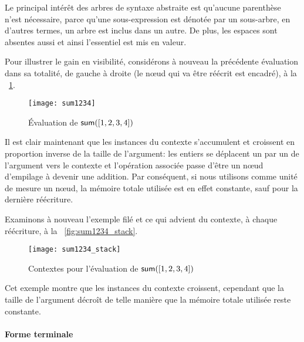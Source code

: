 Le principal intérêt des arbres de syntaxe abstraite est qu'aucune
parenthèse n'est nécessaire, parce qu'une sous-expression est dénotée
par un sous-arbre, en d'autres termes, un arbre est inclus dans un
autre. De plus, les espaces sont absentes aussi et ainsi l'essentiel
est mis en valeur.

Pour illustrer le gain en visibilité, considérons à nouveau la
précédente évaluation dans sa totalité, de gauche à droite (le nœud
qui va être réécrit est encadré), à la \fig~\ref{fig:sum1234}.
\begin{figure}[b]
\centering
\texttt{[image: sum1234]}
\caption{Évaluation de \(\textsf{sum}([1,2,3,4])\)}
\label{fig:sum1234}
\end{figure}
Il est clair maintenant que les instances du contexte s'accumulent et
croissent en proportion inverse de la taille de l'argument: les
entiers se déplacent un par un de l'argument vers le contexte et
l'opération associée passe d'être un nœud
d'empilage à devenir une addition. Par
conséquent, si nous utilisons comme unité de mesure un nœud, la
mémoire totale utilisée est en effet constante, sauf pour la dernière
réécriture.

Examinons à nouveau l'exemple filé et ce qui advient du contexte, à
chaque réécriture, à la \fig~\vref{fig:sum1234_stack}.
\begin{figure}
\centering
\texttt{[image: sum1234\_stack]}
\caption{Contextes pour l'évaluation de \(\textsf{sum}([1,2,3,4])\)}
\label{fig:sum1234_stack}
\end{figure}
Cet exemple montre que les instances du contexte croissent, cependant
que la taille de l'argument décroît de telle manière que la mémoire
totale utilisée reste constante.



\paragraph{Forme terminale}
\label{sec:tail}


